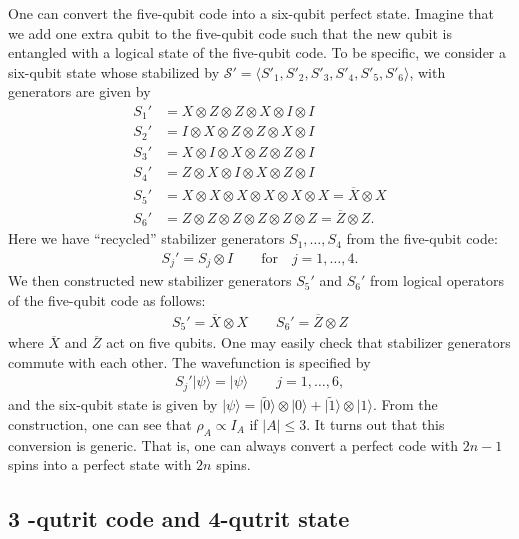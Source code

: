 \documentclass[12pt]{article}
\theoremstyle{plain}
\theoremstyle{plain}
\theoremstyle{plain}
\theoremstyle{plain}
\theoremstyle{result}
\theoremstyle{remark}
\theoremstyle{conjecture}
\theoremstyle{observation}
\theoremstyle{definition}
\theoremstyle{corollary}
\theoremstyle{definition}
\theoremstyle{definition}
\theoremstyle{assumption}
\theoremstyle{definition}
\theoremstyle{problem}
\theoremstyle{fact}
\newcommand*{\cS}{\mathcal{S}}
\begin{document}
One can convert the five-qubit code into a six-qubit perfect state. 
Imagine that we add one extra qubit to the five-qubit code such that the new qubit is entangled with a logical state of the five-qubit code. To be specific, we consider a six-qubit state whose stabilized by $\cS' = \langle S'_1, S'_2, S'_3, S'_4, S'_5 ,S'_6 \rangle$, with generators are given by
\begin{equation}
\begin{split}
S_{1}'&=X\otimes Z\otimes Z \otimes X \otimes  I \otimes  I\\
S_{2}'&=I\otimes X\otimes Z \otimes Z \otimes  X \otimes  I\\
S_{3}'&=X\otimes I\otimes X \otimes Z \otimes  Z \otimes  I\\
S_{4}'&=Z\otimes X\otimes I \otimes X \otimes  Z \otimes  I\\
S_{5}'&=X\otimes X\otimes X \otimes X \otimes  X \otimes  X = \overline{X}\otimes X \\
S_{6}'&=Z\otimes Z\otimes Z \otimes Z \otimes  Z \otimes  Z = \overline{Z}\otimes Z .
\end{split}
\end{equation}
Here we have ``recycled'' stabilizer generators $S_{1},\ldots,S_{4}$ from the five-qubit code: 
\begin{align}
S_{j}' = S_{j} \otimes I \qquad  \mbox{for}\quad j=1,\ldots,4.
\end{align}
We then constructed new stabilizer generators $S_{5}'$ and $S_{6}'$ from logical operators of the five-qubit code as follows:
\begin{align}
S_{5}' = \overline{X} \otimes X \qquad  S_{6}' = \overline{Z} \otimes Z
\end{align}
where $\overline{X}$ and $\overline{Z}$ act on five qubits. One may easily check that stabilizer generators commute with each other. The wavefunction is specified by 
\begin{align}
S_{j}'|\psi\rangle = |\psi\rangle\qquad j=1,\ldots, 6,
\end{align}
and the six-qubit state is given by $|\psi\rangle = |\tilde{0}\rangle \otimes |0\rangle + |\tilde{1}\rangle \otimes |1\rangle$. From the construction, one can see that $\rho_{A}\propto I_{A}$ if $|A|\leq 3$. It turns out that this conversion is generic. That is, one can always convert a perfect code with $2n-1$ spins into a perfect state with $2n$ spins.

\subsection{3 -qutrit code and 4-qutrit state}\label{sec:qutritcode}
\end{document}
